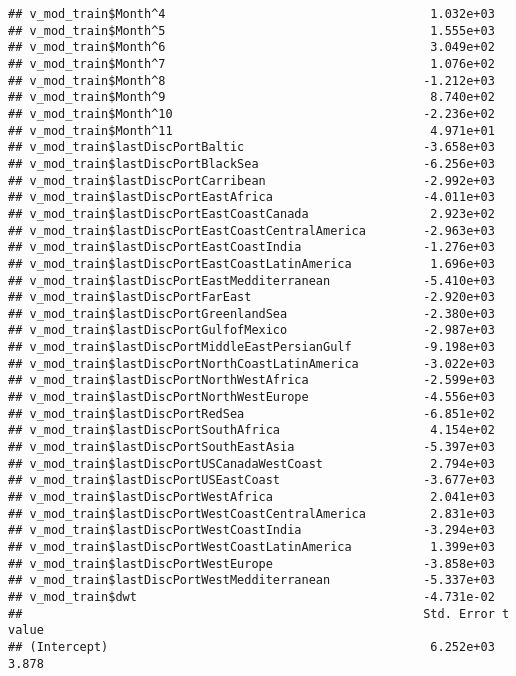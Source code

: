 \documentclass[]{article}
\begin{document}
\begin{verbatim}
## v_mod_train$Month^4                                     1.032e+03
## v_mod_train$Month^5                                     1.555e+03
## v_mod_train$Month^6                                     3.049e+02
## v_mod_train$Month^7                                     1.076e+02
## v_mod_train$Month^8                                    -1.212e+03
## v_mod_train$Month^9                                     8.740e+02
## v_mod_train$Month^10                                   -2.236e+02
## v_mod_train$Month^11                                    4.971e+01
## v_mod_train$lastDiscPortBaltic                         -3.658e+03
## v_mod_train$lastDiscPortBlackSea                       -6.256e+03
## v_mod_train$lastDiscPortCarribean                      -2.992e+03
## v_mod_train$lastDiscPortEastAfrica                     -4.011e+03
## v_mod_train$lastDiscPortEastCoastCanada                 2.923e+02
## v_mod_train$lastDiscPortEastCoastCentralAmerica        -2.963e+03
## v_mod_train$lastDiscPortEastCoastIndia                 -1.276e+03
## v_mod_train$lastDiscPortEastCoastLatinAmerica           1.696e+03
## v_mod_train$lastDiscPortEastMedditerranean             -5.410e+03
## v_mod_train$lastDiscPortFarEast                        -2.920e+03
## v_mod_train$lastDiscPortGreenlandSea                   -2.380e+03
## v_mod_train$lastDiscPortGulfofMexico                   -2.987e+03
## v_mod_train$lastDiscPortMiddleEastPersianGulf          -9.198e+03
## v_mod_train$lastDiscPortNorthCoastLatinAmerica         -3.022e+03
## v_mod_train$lastDiscPortNorthWestAfrica                -2.599e+03
## v_mod_train$lastDiscPortNorthWestEurope                -4.556e+03
## v_mod_train$lastDiscPortRedSea                         -6.851e+02
## v_mod_train$lastDiscPortSouthAfrica                     4.154e+02
## v_mod_train$lastDiscPortSouthEastAsia                  -5.397e+03
## v_mod_train$lastDiscPortUSCanadaWestCoast               2.794e+03
## v_mod_train$lastDiscPortUSEastCoast                    -3.677e+03
## v_mod_train$lastDiscPortWestAfrica                      2.041e+03
## v_mod_train$lastDiscPortWestCoastCentralAmerica         2.831e+03
## v_mod_train$lastDiscPortWestCoastIndia                 -3.294e+03
## v_mod_train$lastDiscPortWestCoastLatinAmerica           1.399e+03
## v_mod_train$lastDiscPortWestEurope                     -3.858e+03
## v_mod_train$lastDiscPortWestMedditerranean             -5.337e+03
## v_mod_train$dwt                                        -4.731e-02
##                                                        Std. Error t value
## (Intercept)                                             6.252e+03   3.878

\end{verbatim}
\end{document}
